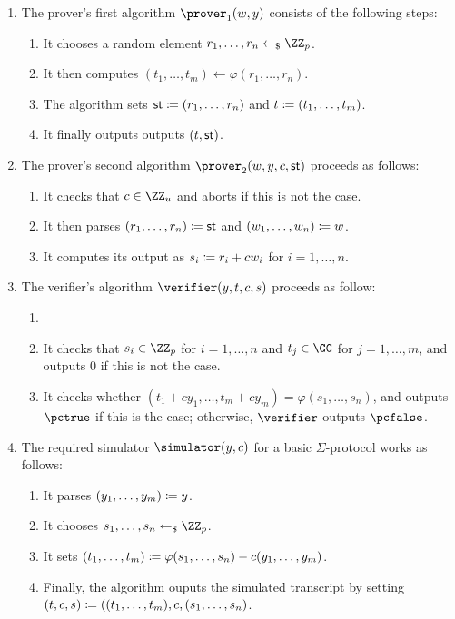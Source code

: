 \documentclass[runningheads]{llncs}
\begin{document}
\begin{enumerate}
  \item\label{item:basic:p1}
    The prover's first algorithm $\prover_1(w,y)$ consists of the following steps:
    \begin{enumerate}
      \item\label{item:basic:p1:randomness}
        It chooses a random element $r_1,\dots,r_n\getsr\ZZ_p$.
      \item
        It then computes $(t_1,\dots,t_m)\gets\varphi(r_1,\dots,r_n)$.
      \item
	The algorithm sets $\mathsf{st}\coloneqq (r_1,\dots,r_n)$ and $t\coloneqq(t_1,\dots,t_m)$.
      \item
        It finally outputs outputs $(t,\mathsf{st})$.
    \end{enumerate}
  \item\label{item:basic:p2}
    The prover's second algorithm $\prover_2(w,y,c,\st)$ proceeds as follows:
    \begin{enumerate}
      \item
        It checks that $c\in\ZZ_u$ and aborts if this is not the case.
      \item
	It then parses $(r_1,\dots,r_n)\coloneqq \mathsf{st}$ and $(w_1,\dots,w_n)\coloneqq w$.
      \item
        It computes its output as $s_i\coloneqq r_i+cw_i$ for $i=1,\dots,n$.
    \end{enumerate}
  \item\label{item:basic:v}
    The verifier's algorithm $\verifier(y,t,c,s)$ proceeds as follow:
    \begin{enumerate}
      \item
      \item\label{item:basic:v:checks}
        It checks that $s_i\in\ZZ_p$ for $i=1,\dots,n$ and $t_j\in\GG$ for $j=1,\dots,m$, and outputs $0$ if this is not the case.
      \item
	It checks whether $(t_1 + cy_1,\dots,t_m + cy_m) = \varphi(s_1,\dots,s_n)$, and outputs $\accept$ if this is the case; otherwise, $\verifier$ outputs $\reject$.
    \end{enumerate}
  \item\label{item:basic:sim}
    The required simulator $\simulator(y,c)$ for a basic $\Sigma$-protocol works as follows:
    \begin{enumerate}
      \item
        It parses $(y_1,\dots,y_m)\coloneqq y$.
      \item\label{item:basic:sim:s}
        It chooses $s_1,\dots,s_n\getsr\ZZ_p$.
      \item
        It sets $(t_1,\dots,t_m) \coloneqq \varphi(s_1,\dots,s_n) - c(y_1,\dots,y_m)$.
      \item
        Finally, the algorithm ouputs the simulated transcript by setting $(t,c,s)\coloneqq((t_1,\dots,t_m),c,(s_1,\dots,s_n)$.
    \end{enumerate}
\end{enumerate}
\end{document}
